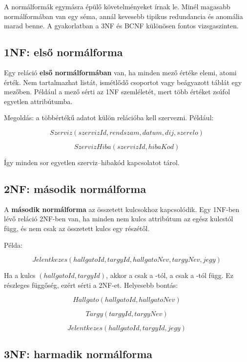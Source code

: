 A normálformák egymásra épülő követelményeket írnak le. Minél magasabb normálformában van egy séma, annál kevesebb tipikus redundancia és anomália marad benne. A gyakorlatban a 3NF és BCNF különösen fontos vizsgaszinten.

\begin{center}

\end{center}

\subsection{1NF: első normálforma}

Egy reláció \textbf{első normálformában} van, ha minden mező értéke elemi, atomi érték. Nem tartalmazhat listát, ismétlődő csoportot vagy beágyazott táblát egy mezőben. Például a  mező sérti az 1NF szemléletét, mert több értéket zsúfol egyetlen attribútumba.

Megoldás: a többértékű adatot külön relációba kell szervezni. Például:

\[
  Szerviz(szervizId, rendszam, datum, dij, szerelo)
\]

\[
  SzervizHiba(szervizId, hibaKod)
\]

Így minden sor egyetlen szerviz--hibakód kapcsolatot tárol.

\subsection{2NF: második normálforma}

A \textbf{második normálforma} az összetett kulcsokhoz kapcsolódik. Egy 1NF-ben lévő reláció 2NF-ben van, ha minden nem kulcs attribútum az egész kulcstól függ, és nem csak az összetett kulcs egy részétől.

Példa:

\[
  Jelentkezes(hallgatoId, targyId, hallgatoNev, targyNev, jegy)
\]

Ha a kulcs \((hallgatoId, targyId)\), akkor a  csak a -tól, a  csak a -tól függ. Ez részleges függőség, ezért sérti a 2NF-et. Helyesebb bontás:

\[
  Hallgato(hallgatoId, hallgatoNev)
\]

\[
  Targy(targyId, targyNev)
\]

\[
  Jelentkezes(hallgatoId, targyId, jegy)
\]

\subsection{3NF: harmadik normálforma}

